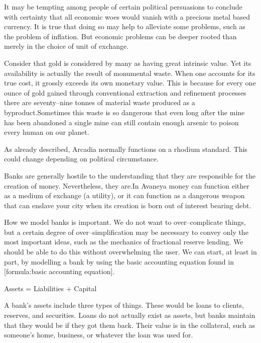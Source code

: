 It may be tempting among people of certain political persuasions to conclude with certainty that all economic woes would vanish with a precious metal based currency. It is true that doing so may help to alleviate some problems, such as the problem of inflation. But economic problems can be deeper rooted than merely in the choice of unit of exchange.

Consider that gold is considered by many as having great intrinsic value. Yet its availability is actually the result of monumental waste. When one accounts for its true cost, it grossly exceeds its own monetary value. This is because for every one ounce of gold gained through conventional extraction and refinement processes there are seventy--nine tonnes of material waste produced as a byproduct.\footnotecite[oxfam2004] Sometimes this waste is so dangerous that even long after the mine has been abandoned a single mine can still contain enough arsenic to poison every human on our planet.


As already described, Arcadia normally functions on a rhodium standard. This could change depending on political circumstance.

Banks are generally hostile to the understanding that they are responsible for the creation of money. Nevertheless, they are. In Avaneya money can function either as a medium of exchange (a utility), or it can function as a dangerous weapon that can enslave your city when its creation is born out of interest bearing debt.

How we model banks is important. We do not want to over--complicate things, but a certain degree of over--simplification may be necessary to convey only the most important ideas, such as the mechanics of fractional reserve lending. We should be able to do this without overwhelming the user. We can start, at least in part, by modelling a bank by using the basic accounting equation found in [formula:basic accounting equation].

\crlf
{}
\startformula
Assets = Liabilities + Capital
\stopformula
\crlf

A bank's assets include three types of things. These would be loans to clients, reserves, and securities. Loans do not actually exist as assets, but banks maintain that they would be if they got them back. Their value is in the collateral, such as someone's home, business, or whatever the loan was used for.


